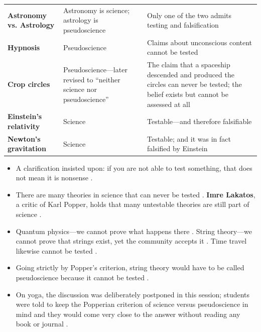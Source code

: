 \vspace{6pt}
\noindent
\begin{tabularx}{\textwidth}{p{3.5cm} p{4cm} Y}
\toprule
{}
 &  &  \\
\midrule
\textbf{Astronomy vs. Astrology} & Astronomy is science; astrology is pseudoscience & Only one of the two admits testing and falsification  \\
\textbf{Hypnosis} & Pseudoscience & Claims about unconscious content cannot be tested  \\
\textbf{Crop circles} & Pseudoscience---later revised to ``neither science nor pseudoscience'' & The claim that a spaceship descended and produced the circles can never be tested; the belief exists but cannot be assessed at all  \\
\textbf{Einstein's relativity} & Science & Testable---and therefore falsifiable  \\
\textbf{Newton's gravitation} & Science & Testable; and it was in fact falsified by Einstein  \\
\bottomrule
\end{tabularx}
\vspace{6pt}

\begin{CriticalPoint}
\begin{itemize}
    \item A clarification insisted upon: if you are not able to test something, that does not mean it is nonsense .
    \item There are many theories in science that can never be tested . \textbf{Imre Lakatos}, a critic of Karl Popper, holds that many untestable theories are still part of science .
    \item Quantum physics---we cannot prove what happens there . String theory---we cannot prove that strings exist, yet the community accepts it . Time travel likewise cannot be tested .
    \item Going strictly by Popper's criterion, string theory would have to be called pseudoscience because it cannot be tested .
    \item On yoga, the discussion was deliberately postponed in this session; students were told to keep the Popperian criterion of science versus pseudoscience in mind and they would come very close to the answer without reading any book or journal .
\end{itemize}
\end{CriticalPoint}

